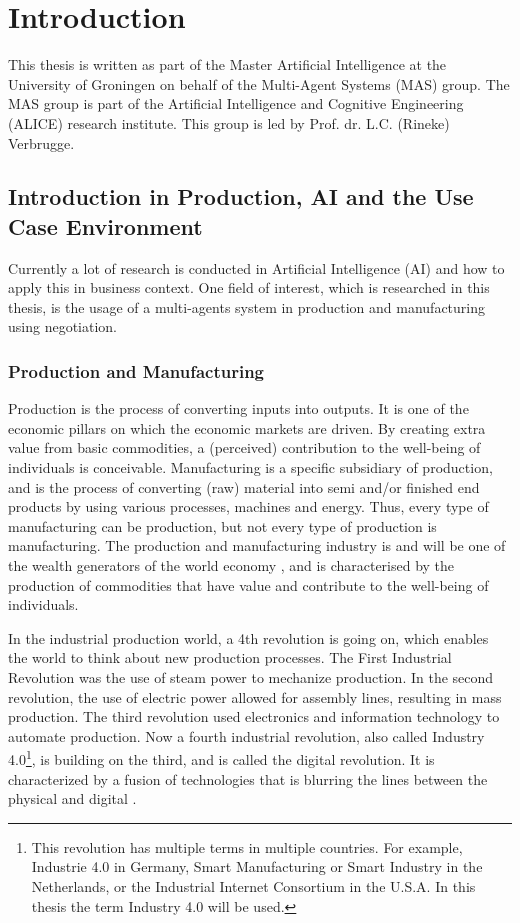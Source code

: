 \chapter{Introduction}
\label{ch:intro}
This thesis is written as part of the Master Artificial Intelligence at the University of Groningen on behalf of the Multi-Agent Systems (MAS) group. The MAS group is part of the Artificial Intelligence and Cognitive Engineering (ALICE) research institute. This group is led by Prof. dr. L.C. (Rineke) Verbrugge.  
   
\section{Introduction in Production, AI and the Use Case Environment}

Currently a lot of research is conducted in Artificial Intelligence (AI) and how to apply this in business context. One field of interest, which is researched in this thesis, is the usage of a multi-agents system in production and manufacturing using negotiation.

\subsection{Production and Manufacturing}
Production is the process of converting inputs into outputs. It is one of the economic pillars on which the economic markets are driven. By creating extra value from basic commodities, a (perceived) contribution to the well-being of individuals is conceivable. Manufacturing is a specific subsidiary of production, and is the process of converting (raw) material into semi and/or finished end products by using various processes, machines and energy. Thus, every type of manufacturing can be production, but not every type of production is manufacturing. The production and manufacturing industry is and will be one of the wealth generators of the world economy \citep{monostori2006agent}, and is characterised by the production of commodities that have value and contribute to the well-being of individuals.

In the industrial production world, a 4th revolution is going on, which enables the world to think about new production processes. The First Industrial Revolution was the use of steam power to mechanize production. In the second revolution, the use of electric power allowed for assembly lines, resulting in mass production. The third revolution used electronics and information technology to automate production. Now a fourth industrial revolution, also called Industry 4.0\footnote{This revolution has multiple terms in multiple countries. For example, Industrie 4.0 in Germany, Smart Manufacturing or Smart Industry in the Netherlands, or the Industrial Internet Consortium in the U.S.A. In this thesis the term Industry 4.0 will be used.}, is building on the third, and is called the digital revolution. It is characterized by a fusion of technologies that is blurring the lines between the physical and digital \citep{leitao2016smart}.

